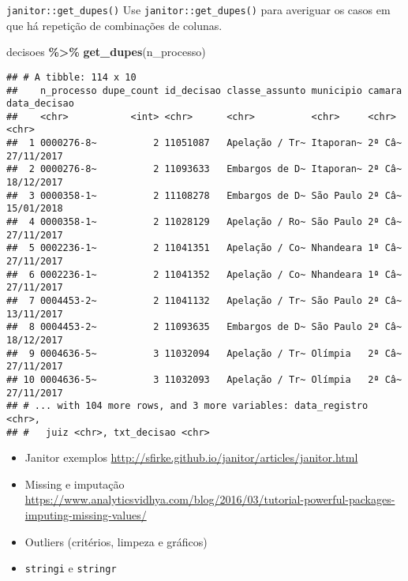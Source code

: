 \documentclass[
  10pt,
  ignorenonframetext,
]{beamer}
\newenvironment{Shaded}{\begin{snugshade}}{\end{snugshade}}
\newcommand{\KeywordTok}[1]{\textcolor[rgb]{0.13,0.29,0.53}{\textbf{#1}}}
\newcommand{\NormalTok}[1]{#1}
\newcommand{\OperatorTok}[1]{\textcolor[rgb]{0.81,0.36,0.00}{\textbf{#1}}}
\newcommand{\StringTok}[1]{\textcolor[rgb]{0.31,0.60,0.02}{#1}}
\begin{document}
\begin{frame}[fragile]{\texttt{janitor::get\_dupes()}}
\protect\hypertarget{janitorget_dupes-1}{}
Use \texttt{janitor::get\_dupes()} para averiguar os casos em que há
repetição de combinações de colunas.

\begin{Shaded}
\begin{Highlighting}[]
\NormalTok{decisoes }\OperatorTok{\%\textgreater{}\%}\StringTok{ }
\StringTok{  }\KeywordTok{get\_dupes}\NormalTok{(n\_processo)}
\end{Highlighting}
\end{Shaded}
\end{frame}

\begin{frame}[fragile]{}
\protect\hypertarget{section-12}{}
\begin{verbatim}
## # A tibble: 114 x 10
##    n_processo dupe_count id_decisao classe_assunto municipio camara data_decisao
##    <chr>           <int> <chr>      <chr>          <chr>     <chr>  <chr>       
##  1 0000276-8~          2 11051087   Apelação / Tr~ Itaporan~ 2ª Câ~ 27/11/2017  
##  2 0000276-8~          2 11093633   Embargos de D~ Itaporan~ 2ª Câ~ 18/12/2017  
##  3 0000358-1~          2 11108278   Embargos de D~ São Paulo 2ª Câ~ 15/01/2018  
##  4 0000358-1~          2 11028129   Apelação / Ro~ São Paulo 2ª Câ~ 27/11/2017  
##  5 0002236-1~          2 11041351   Apelação / Co~ Nhandeara 1ª Câ~ 27/11/2017  
##  6 0002236-1~          2 11041352   Apelação / Co~ Nhandeara 1ª Câ~ 27/11/2017  
##  7 0004453-2~          2 11041132   Apelação / Tr~ São Paulo 2ª Câ~ 13/11/2017  
##  8 0004453-2~          2 11093635   Embargos de D~ São Paulo 2ª Câ~ 18/12/2017  
##  9 0004636-5~          3 11032094   Apelação / Tr~ Olímpia   2ª Câ~ 27/11/2017  
## 10 0004636-5~          3 11032093   Apelação / Tr~ Olímpia   2ª Câ~ 27/11/2017  
## # ... with 104 more rows, and 3 more variables: data_registro <chr>,
## #   juiz <chr>, txt_decisao <chr>
\end{verbatim}
\end{frame}

\begin{frame}[fragile]{}
\protect\hypertarget{section-13}{}
\begin{itemize}
\item
  Janitor exemplos
  \url{http://sfirke.github.io/janitor/articles/janitor.html}
\item
  Missing e imputação
  \url{https://www.analyticsvidhya.com/blog/2016/03/tutorial-powerful-packages-imputing-missing-values/}
\item
  Outliers (critérios, limpeza e gráficos)
\item
  \texttt{stringi} e \texttt{stringr}
\end{itemize}
\end{frame}
\end{document}

